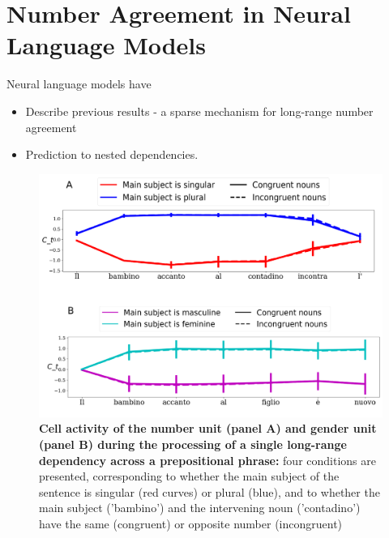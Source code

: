 \section{Number Agreement in Neural Language Models}

Neural language models have 

\begin{itemize}
    \item Describe previous results - a sparse mechanism for long-range number agreement
    \item Prediction to nested dependencies.
\end{itemize}

\begin{figure}
    \centering
    \includegraphics[width=\textwidth]{figures/model_activations_nounpp.png}
    \caption{\textbf{Cell activity of the number unit (panel A) and gender unit (panel B) during the processing of a single long-range dependency across a prepositional phrase:} four conditions are presented, corresponding to whether the main subject of the sentence is singular (red curves) or plural (blue), and to whether the main subject ('bambino') and the intervening noun ('contadino') have the same (congruent) or opposite number (incongruent)}
    \label{fig:nounpp}
\end{figure} 


